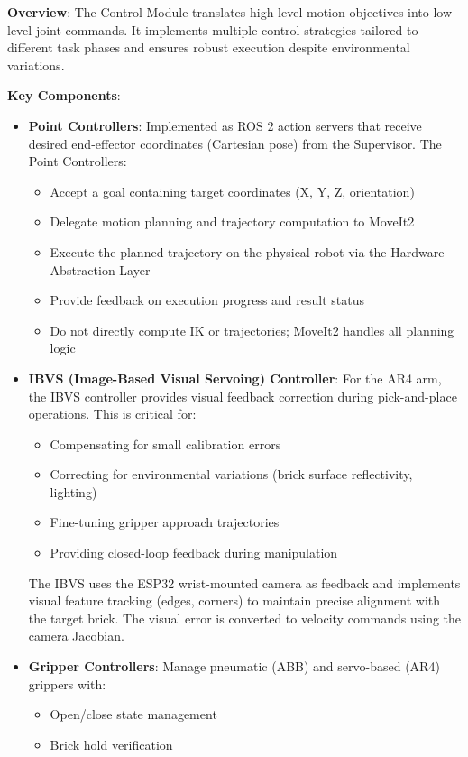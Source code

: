 \textbf{Overview}: The Control Module translates high-level motion objectives into low-level joint commands. It implements multiple control strategies tailored to different task phases and ensures robust execution despite environmental variations.

\textbf{Key Components}:

\begin{itemize}
    \item \textbf{Point Controllers}: Implemented as ROS 2 action servers that receive desired end-effector coordinates (Cartesian pose) from the Supervisor. The Point Controllers:
    \begin{itemize}
        \item Accept a goal containing target coordinates (X, Y, Z, orientation)
        \item Delegate motion planning and trajectory computation to MoveIt2
        \item Execute the planned trajectory on the physical robot via the Hardware Abstraction Layer
        \item Provide feedback on execution progress and result status
        \item Do not directly compute IK or trajectories; MoveIt2 handles all planning logic
    \end{itemize}
        
    \item \textbf{IBVS (Image-Based Visual Servoing) Controller}: For the AR4 arm, the IBVS controller provides visual feedback correction during pick-and-place operations. This is critical for:
    \begin{itemize}
        \item Compensating for small calibration errors
        \item Correcting for environmental variations (brick surface reflectivity, lighting)
        \item Fine-tuning gripper approach trajectories
        \item Providing closed-loop feedback during manipulation
    \end{itemize}
    
    The IBVS uses the ESP32 wrist-mounted camera as feedback and implements visual feature tracking (edges, corners) to maintain precise alignment with the target brick. The visual error is converted to velocity commands using the camera Jacobian.
    
    \item \textbf{Gripper Controllers}: Manage pneumatic (ABB) and servo-based (AR4) grippers with:
    \begin{itemize}
        \item Open/close state management
        \item Brick hold verification
    \end{itemize}
\end{itemize}

